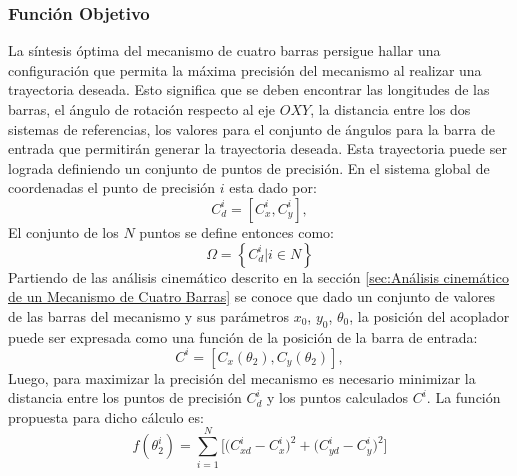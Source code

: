 \subsubsection{Función Objetivo}\label{sec:Funcion Objetivo de MEC}
La síntesis óptima del mecanismo de cuatro barras persigue hallar una configuración que permita la máxima precisión del mecanismo al realizar una trayectoria deseada. Esto significa que se deben encontrar las longitudes de las barras, el ángulo de rotación respecto al eje $OXY$, la distancia entre los dos sistemas de referencias, los valores para el conjunto de ángulos para la barra de entrada que permitirán generar la trayectoria deseada. Esta trayectoria puede ser lograda definiendo un conjunto de puntos de precisión. En el sistema global de coordenadas el punto de precisión $i$ esta dado por:
\begin{equation}
C^i_d=\left[C^i_x,C^i_y \right],
\end{equation}
El conjunto de los $N$ puntos se define entonces como:
\begin{equation}
\Omega=\left \{ C^i_d | i \in N \right \}
\end{equation}
Partiendo de las análisis cinemático descrito en la sección \ref{sec:Análisis cinemático de un Mecanismo de Cuatro Barras} se conoce que dado un conjunto de valores de las barras del mecanismo y sus parámetros $x_0$, $y_0$, $\theta_0$, la posición del acoplador puede ser expresada como una función de la posición de la barra de entrada: 
\begin{equation}
C^i=\left[C_x\left(\theta_2\right),C_y\left(\theta_2 \right) \right],
\end{equation}
Luego, para maximizar la precisión del mecanismo es necesario minimizar la distancia entre los puntos de precisión $C^i_d$ y los puntos calculados $C^i$. La función propuesta para dicho cálculo es:
\begin{equation}
f(\theta^i_2)= \sum_{i=1}^{N} \big[\big(C^{i}_{xd}-C^{i}_{x} \big)^2 +\big(C^{i}_{yd}-C^{i}_{y} \big)^2\big]
\end{equation}
